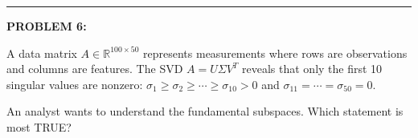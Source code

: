 \documentclass[12pt]{amsart}
\newcommand{\divider}{
  \vspace{-1em} %
  \noindent
  \raisebox{-0.15ex}{\textbullet}%
  \hspace{0.5em}%
  \rule[0.5ex]{0.95\textwidth}{1.0pt}%
  \hspace{0.5em}%
  \raisebox{-0.15ex}{\textbullet}%
  \vspace{0em} %
}
\begin{document}

\divider


{\bf PROBLEM 6:}

A data matrix $A \in \mathbb{R}^{100 \times 50}$ represents measurements where rows are observations and columns are features. The SVD $A = U\Sigma V^T$ reveals that only the first 10 singular values are nonzero: $\sigma_1 \geq \sigma_2 \geq \cdots \geq \sigma_{10} > 0$ and $\sigma_{11} = \cdots = \sigma_{50} = 0$.

An analyst wants to understand the fundamental subspaces. Which statement is most TRUE?
\end{document}
